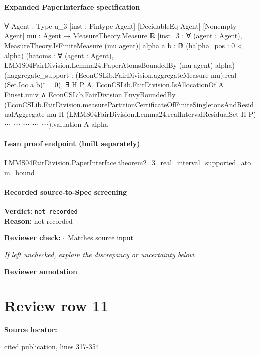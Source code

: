 \documentclass[10pt]{article}
\newcommand{\reviewerbox}{%
  \par\noindent\fbox{\parbox{0.96\linewidth}{\rule{0pt}{0.38in}}}\par
}
\newcommand{\reviewmatch}[1]{%
  \par\noindent\textbf{Reviewer check:} $\square$\; #1\par
  \noindent\emph{If left unchecked, explain the discrepancy or uncertainty below.}\par
}
\begin{document}
\paragraph{Expanded PaperInterface specification}
\begin{ReviewVerbatim}
∀ {Agent : Type u_3} [inst : Fintype Agent] [DecidableEq Agent] [Nonempty Agent] {mu : Agent → MeasureTheory.Measure ℝ}
  [inst_3 : ∀ (agent : Agent), MeasureTheory.IsFiniteMeasure (mu agent)] {alpha a b : ℝ} (halpha_pos : 0 < alpha)
  (hatoms : ∀ (agent : Agent), LMMS04FairDivision.Lemma24.PaperAtomsBoundedBy (mu agent) alpha)
  (haggregate_support : (EconCSLib.FairDivision.aggregateMeasure mu).real (Set.Ioc a b)ᶜ = 0),
  ∃ H P A,
    EconCSLib.FairDivision.IsAllocationOf A Finset.univ ∧
      EconCSLib.FairDivision.EnvyBoundedBy
        (EconCSLib.FairDivision.measurePartitionCertificateOfFiniteSingletonsAndResidualAggregate mu H
            (LMMS04FairDivision.Lemma24.realIntervalResidualSet H P) ⋯ ⋯ ⋯ ⋯ ⋯).valuation
        A alpha
\end{ReviewVerbatim}

\paragraph{Lean proof endpoint (built separately)}\begin{ReviewVerbatim}
LMMS04FairDivision.PaperInterface.theorem2_3_real_interval_supported_atom_bound
\end{ReviewVerbatim}

\paragraph{Recorded source-to-Spec screening}
\textbf{Verdict:} \texttt{not recorded}
\\
\textbf{Reason:} not recorded
\reviewmatch{Matches source input}
\noindent\textbf{Reviewer annotation}\par
\reviewerbox
\clearpage
\hypertarget{source-claim-e6ceda312a1e0767}{}
\section*{Review row 11}
\textbf{Source locator:} {\footnotesize\raggedright cited publication, lines 317-\allowbreak{}354\par}
\end{document}
